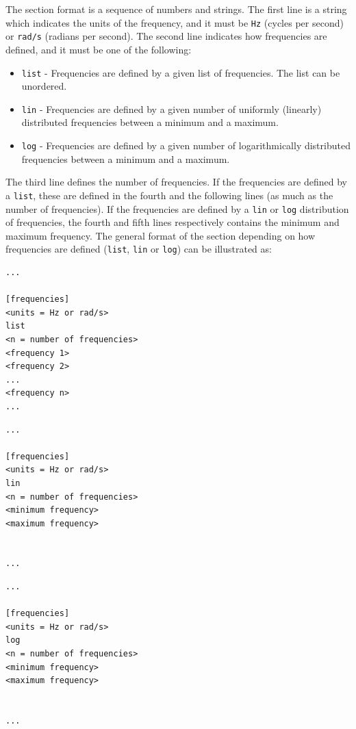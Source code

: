 \documentclass[a4paper,fleqn]{book}
\begin{document}
The section format is a sequence of numbers and strings. The first line is a string which indicates the units of the frequency, and it must be \texttt{Hz} (cycles per second) or \texttt{rad/s} (radians per second). The second line indicates how frequencies are defined, and it must be one of the following:
\begin{itemize}
    \item \texttt{list} - Frequencies are defined by a given list of frequencies. The list can be unordered.
    \item \texttt{lin} - Frequencies are defined by a given number of uniformly (linearly) distributed frequencies between a minimum and a maximum.
    \item \texttt{log} - Frequencies are defined by a given number of logarithmically distributed frequencies between a minimum and a maximum.
\end{itemize}
The third line defines the number of frequencies. If the frequencies are defined by a \texttt{list}, these are defined in the fourth and the following lines (as much as the number of frequencies). If the frequencies are defined by a \texttt{lin} or \texttt{log} distribution of frequencies, the fourth and fifth lines respectively contains the minimum and maximum frequency. The general format of the section depending on how frequencies are defined (\texttt{list}, \texttt{lin} or \texttt{log}) can be illustrated as:
\begin{center}
\begin{minipage}{0.3\textwidth}
\begin{Verbatim}[frame=single, fontsize=\small, label=input.dat]
...

[frequencies]
<units = Hz or rad/s>
list
<n = number of frequencies>
<frequency 1>
<frequency 2>
...
<frequency n>
...
\end{Verbatim}
\end{minipage}
\begin{minipage}{0.3\textwidth}
\begin{Verbatim}[frame=single, fontsize=\small, label=input.dat]
...

[frequencies]
<units = Hz or rad/s>
lin
<n = number of frequencies>
<minimum frequency>
<maximum frequency>


...
\end{Verbatim}
\end{minipage}
\begin{minipage}{0.3\textwidth}
\begin{Verbatim}[frame=single, fontsize=\small, label=input.dat]
...

[frequencies]
<units = Hz or rad/s>
log
<n = number of frequencies>
<minimum frequency>
<maximum frequency>


...
\end{Verbatim}
\end{minipage}
\end{center}
\end{document}
